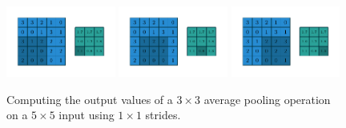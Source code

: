 \begin{figure}
    \includegraphics[width=0.32\textwidth]{pdf/numerical_average_pooling_06.pdf}
    \includegraphics[width=0.32\textwidth]{pdf/numerical_average_pooling_07.pdf}
    \includegraphics[width=0.32\textwidth]{pdf/numerical_average_pooling_08.pdf}
    \caption{\label{fig:numerical_average_pooling} Computing the output values
        of a $3 \times 3$ average pooling operation on a $5 \times 5$ input
        using $1 \times 1$ strides.}
\end{figure}



